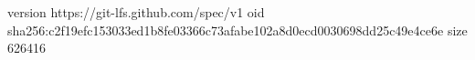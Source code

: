 version https://git-lfs.github.com/spec/v1
oid sha256:c2f19efc153033ed1b8fe03366c73afabe102a8d0ecd0030698dd25c49e4ce6e
size 626416

